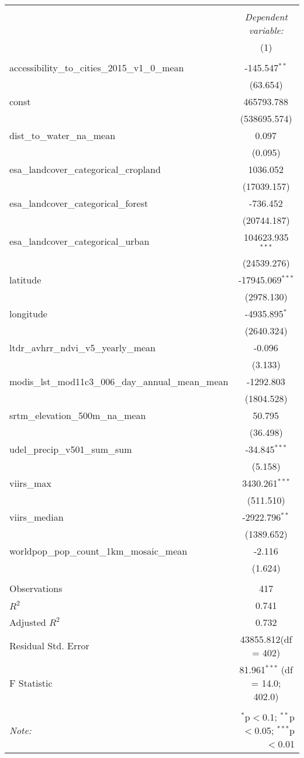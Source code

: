 \begin{table}[!htbp] \centering
\begin{tabular}{@{\extracolsep{5pt}}lc}
\\[-1.8ex]\hline
\hline \\[-1.8ex]
& \multicolumn{1}{c}{\textit{Dependent variable:}} \
\cr \cline{1-2}
\\[-1.8ex] & (1) \\
\hline \\[-1.8ex]
 accessibility_to_cities_2015_v1_0_mean & -145.547$^{**}$ \\
  & (63.654) \\
 const & 465793.788$^{}$ \\
  & (538695.574) \\
 dist_to_water_na_mean & 0.097$^{}$ \\
  & (0.095) \\
 esa_landcover_categorical_cropland & 1036.052$^{}$ \\
  & (17039.157) \\
 esa_landcover_categorical_forest & -736.452$^{}$ \\
  & (20744.187) \\
 esa_landcover_categorical_urban & 104623.935$^{***}$ \\
  & (24539.276) \\
 latitude & -17945.069$^{***}$ \\
  & (2978.130) \\
 longitude & -4935.895$^{*}$ \\
  & (2640.324) \\
 ltdr_avhrr_ndvi_v5_yearly_mean & -0.096$^{}$ \\
  & (3.133) \\
 modis_lst_mod11c3_006_day_annual_mean_mean & -1292.803$^{}$ \\
  & (1804.528) \\
 srtm_elevation_500m_na_mean & 50.795$^{}$ \\
  & (36.498) \\
 udel_precip_v501_sum_sum & -34.845$^{***}$ \\
  & (5.158) \\
 viirs_max & 3430.261$^{***}$ \\
  & (511.510) \\
 viirs_median & -2922.796$^{**}$ \\
  & (1389.652) \\
 worldpop_pop_count_1km_mosaic_mean & -2.116$^{}$ \\
  & (1.624) \\
\hline \\[-1.8ex]
 Observations & 417 \\
 $R^2$ & 0.741 \\
 Adjusted $R^2$ & 0.732 \\
 Residual Std. Error & 43855.812(df = 402)  \\
 F Statistic & 81.961$^{***}$ (df = 14.0; 402.0) \\
\hline
\hline \\[-1.8ex]
\textit{Note:} & \multicolumn{1}{r}{$^{*}$p$<$0.1; $^{**}$p$<$0.05; $^{***}$p$<$0.01} \\
\end{tabular}
\end{table}